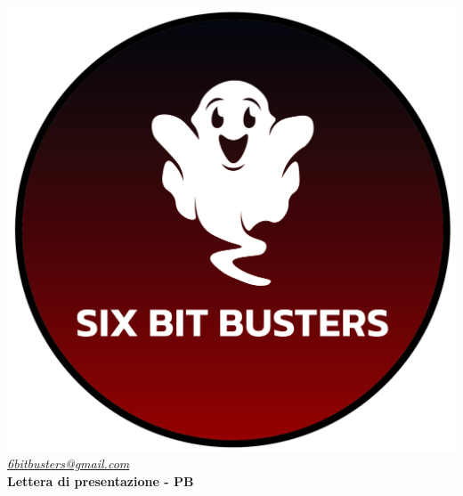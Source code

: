 \thispagestyle{empty}
\renewcommand{\arraystretch}{1.0}


\begin{titlepage}
	\begin{center}
	\includegraphics[scale = 0.5]{template/images/logo-circle.png}
	\\[1cm]
	\href{mailto:6bitbusters@gmail.com}		      	
	{\large{\textit{6bitbusters@gmail.com} } }\\[1cm]
	
	{\Huge{ \textbf{Lettera di presentazione - PB} } }\\[1cm]
        \end{center}
	
	
	
\end{titlepage}
